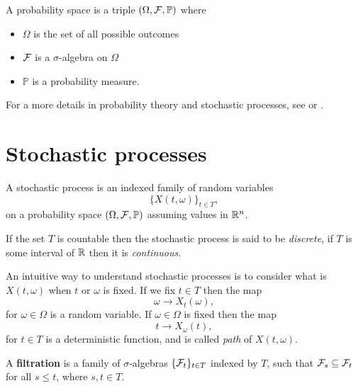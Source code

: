 \begin{definition}
    A probability space is a triple $(\Omega, \mathcal{F}, \mathbb{P})$ where
    \begin{itemize}
        \item $\Omega$ is the set of all possible outcomes
        \item $\mathcal{F}$ is a $\sigma$-algebra on $\Omega$
        \item $\mathbb{P}$ is a probability measure.
    \end{itemize}
\end{definition}

For a more details in probability theory and stochastic processes, see \cite{kallenberg_probability} or \cite{klenke_probability}.

\section{Stochastic processes}

\begin{definition}
    A stochastic process is an indexed family of random variables
    \begin{equation*}
        \{ X(t, \omega) \}_{t \in T},
    \end{equation*}
    on a probability space $(\Omega, \mathcal{F}, \mathbb{P})$ assuming values in $\mathbb{R}^n$.
\end{definition}

If the set $T$ is countable then the stochastic process is said to be \textit{discrete},
if $T$ is some interval of $\mathbb{R}$ then it is \textit{continuous}.

An intuitive way to understand stochastic processes is to consider what is $X(t, \omega)$ when $t$ or $\omega$ is fixed.
If we fix $t \in T$ then the map
\begin{equation*}
    \omega \rightarrow X_t(\omega),
\end{equation*}
for $\omega \in \Omega$ is a random variable.
If $\omega \in \Omega$ is fixed then the map
\begin{equation*}
    t \rightarrow X_\omega(t),
\end{equation*}
for $t \in T$ is a deterministic function, and is called \textit{path} of $X(t, \omega)$.

\begin{definition}[Filtration]
A \textbf{filtration} is a family of $\sigma$-algebras $\{ \mathcal{F}_t \}_{t \in T}$ indexed by $T$,
such that $\mathcal{F}_s \subseteq \mathcal{F}_t$ for all $s \leq t$, where $s, t \in T$.
\end{definition}

